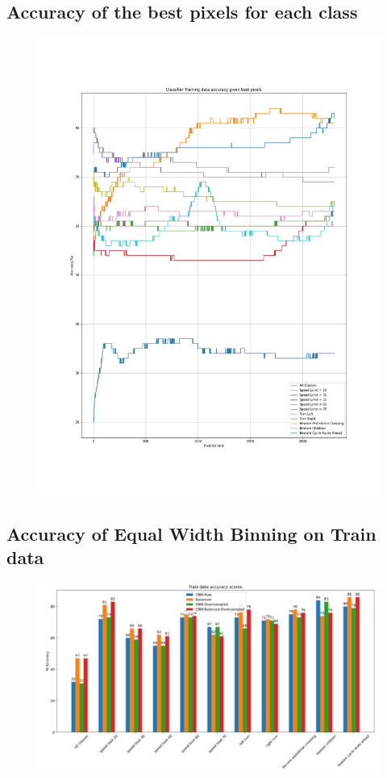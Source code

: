 \documentclass[11pt]{article}
\begin{document}
\begin{appendices}
\newpage
\subsection{Accuracy of the best pixels for each class}\label{train_2304}
\begin{figure}[h!]
  \centering
  \includegraphics[scale=0.4]{Images/train_2304_pixels.png}
\end{figure}

\newpage
\subsection{Accuracy of Equal Width Binning on Train data}\label{BarChartEWBTrain}
\begin{figure}[h!]
  \centering
  \includegraphics[scale=0.6]{Images/BarChartEWBTrain.PNG}
\end{figure}


\end{appendices}
\end{document}
